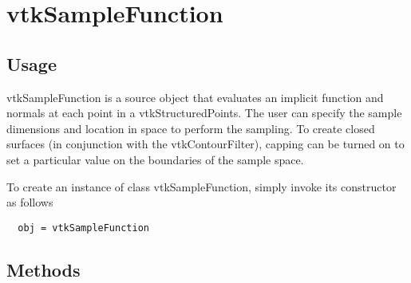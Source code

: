 \section{vtkSampleFunction}

\subsection{Usage}

 vtkSampleFunction is a source object that evaluates an implicit function
 and normals at each point in a vtkStructuredPoints. The user can specify
 the sample dimensions and location in space to perform the sampling. To
 create closed surfaces (in conjunction with the vtkContourFilter), capping
 can be turned on to set a particular value on the boundaries of the sample
 space.

To create an instance of class vtkSampleFunction, simply
invoke its constructor as follows
\begin{verbatim}
  obj = vtkSampleFunction
\end{verbatim}
\subsection{Methods}

